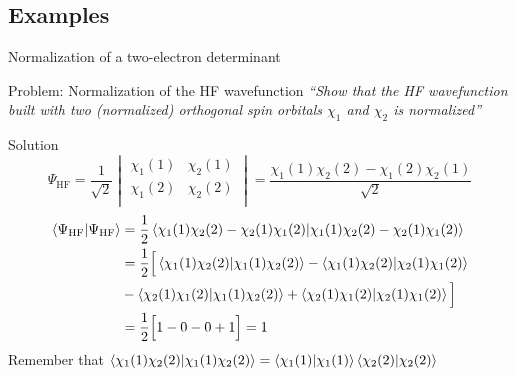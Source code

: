 \documentclass[aspectratio=169,9pt]{beamer}
\newcommand{\violet}[1]{\textcolor{hfViolet}{#1}}
\begin{document}
\subsection{Examples}
\begin{frame}{Normalization of a two-electron determinant}
	\begin{block}{Problem: Normalization of the HF wavefunction}
		\textit{\violet{``Show that the HF wavefunction built with two (normalized) orthogonal spin orbitals $\chi_1$ and $\chi_2$ is normalized''}}
	\end{block}
	\pause
	\begin{block}{Solution}
		\small
		\begin{equation*}
			\Psi_\text{HF} = 
			\frac{1}{\sqrt{2}}
			\begin{vmatrix}
				\chi_1(1)	&	\chi_2(1)		\\
				\chi_1(2)	&	\chi_2(2)		\\
			\end{vmatrix}
			= \frac{ \chi_1(1) \chi_2(2) -  \chi_1(2) \chi_2(1)}{\sqrt{2}}
		\end{equation*}
		\begin{equation*}
		\begin{split}
			\braket{\Psi_\text{HF}}{\Psi_\text{HF}} 
			& = \frac{1}{2} \braket{\chi_1(1) \chi_2(2) -  \chi_2(1) \chi_1(2)}{ \chi_1(1) \chi_2(2) -  \chi_2(1) \chi_1(2) }
			\\
			& = \frac{1}{2} \Big[ 
			\braket{ \chi_1(1) \chi_2(2)  }{ \chi_1(1) \chi_2(2)  }
			- \braket{ \chi_1(1) \chi_2(2)  }{   \chi_2(1) \chi_1(2) }
			\\
			& - \braket{ \chi_2(1) \chi_1(2) }{ \chi_1(1) \chi_2(2)  }
			+ \braket{ \chi_2(1) \chi_1(2) }{   \chi_2(1) \chi_1(2) }
			\Big]
			\\
			& =  \frac{1}{2} \Big[ 1 - 0 - 0 + 1 \Big] = 1
		\end{split}
		\end{equation*}
		\alert{Remember that $\braket{\chi_1(1) \chi_2(2) }{ \chi_1(1) \chi_2(2)  } = \braket{ \chi_1(1)   }{ \chi_1(1)  } \braket{ \chi_2(2)  }{ \chi_2(2)  }$}
	\end{block}
\end{frame}
\end{document}
